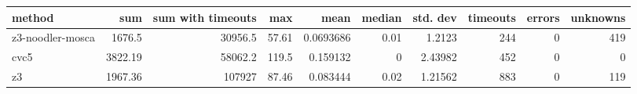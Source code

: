 \begin{tabular}{lrrrrrrrrr}
\hline
 method           &     sum &   sum with timeouts &    max &      mean &   median &   std. dev &   timeouts &   errors &   unknowns \\
\hline
 z3-noodler-mosca & 1676.5  &             30956.5 &  57.61 & 0.0693686 &     0.01 &    1.2123  &        244 &        0 &        419 \\
 cvc5             & 3822.19 &             58062.2 & 119.5  & 0.159132  &     0    &    2.43982 &        452 &        0 &          0 \\
 z3               & 1967.36 &            107927   &  87.46 & 0.083444  &     0.02 &    1.21562 &        883 &        0 &        119 \\
\hline
\end{tabular}
